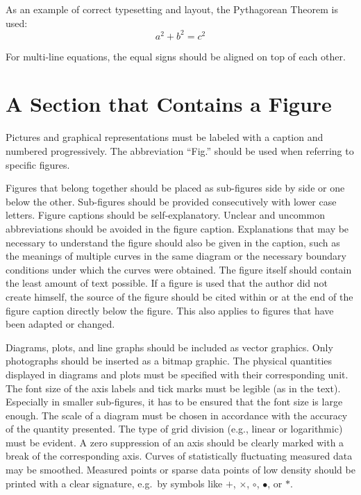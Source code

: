 As an example of correct typesetting and layout, the Pythagorean Theorem is used:
\begin{equation}
	a^2 + b^2 = c^2
\end{equation}

For multi-line equations, the equal signs should be aligned on top of each other.

\section{A Section that Contains a Figure}

Pictures and graphical representations must be labeled with a caption and numbered progressively. The abbreviation ``Fig.'' should be used when referring to specific figures.

Figures that belong together should be placed as sub-figures side by side or one below the other. Sub-figures should be provided consecutively with lower case letters. Figure captions should be self-explanatory. Unclear and uncommon abbreviations should be avoided in the figure caption. Explanations that may be necessary to understand the figure should also be given in the caption, such as the meanings of multiple curves in the same diagram or the necessary boundary conditions under which the curves were obtained. The figure itself should contain the least amount of text possible. If a figure is used that the author did not create himself, the source of the figure should be cited within or at the end of the figure caption directly below the figure. This also applies to figures that have been adapted or changed.

Diagrams, plots, and line graphs should be included as vector graphics. Only photographs should be inserted as a bitmap graphic. The physical quantities displayed in diagrams and plots must be specified with their corresponding unit. The font size of the axis labels and tick marks must be legible (as in the text). Especially in smaller sub-figures, it has to be ensured that the font size is large enough. The scale of a diagram must be chosen in accordance with the accuracy of the quantity presented. The type of grid division (e.g., linear or logarithmic) must be evident. A zero suppression of an axis should be clearly marked with a break of the corresponding axis. Curves of statistically fluctuating measured data may be smoothed. Measured points or sparse data points of low density should be printed with a clear signature, e.g.~by symbols like $+$, $\times$, $\circ$, $\bullet$, or $\ast$.

